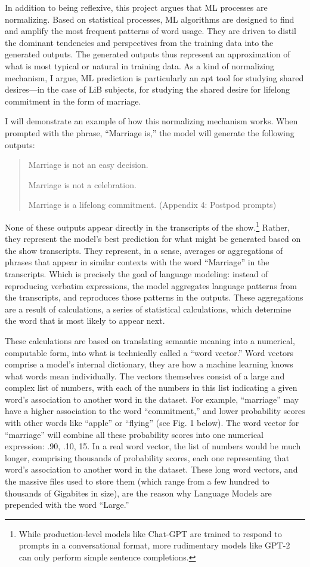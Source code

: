 \documentclass[11pt]{article}
\begin{document}
In addition to being reflexive, this project argues that ML processes
are normalizing. Based on statistical processes, ML algorithms are
designed to find and amplify the most frequent patterns of word usage.
They are driven to distil the dominant tendencies and perspectives
from the training data into the generated outputs. The generated
outputs thus represent an approximation of what is most typical or
natural in training data. As a kind of normalizing mechanism, I argue,
ML prediction is particularly an apt tool for studying shared
desires—in the case of LiB subjects, for studying the shared desire
for lifelong commitment in the form of marriage.

I will demonstrate an example of how this normalizing mechanism works.
When prompted with the phrase, “Marriage is,” the model will generate
the following outputs:

\begin{quote}
Marriage is not an easy decision.

Marriage is not a celebration.

Marriage is a lifelong commitment. (Appendix 4: Postpod prompts)
\end{quote}
None of these outputs appear directly in the transcripts of the
show.\footnote{While production-level models like Chat-GPT are trained to
respond to prompts in a conversational format, more rudimentary models
like GPT-2 can only perform simple sentence completions.} Rather, they represent the model’s best prediction for
what might be generated based on the show transcripts. They represent,
in a sense, averages or aggregations of phrases that appear in similar
contexts with the word “Marriage” in the transcripts. Which is
precisely the goal of language modeling: instead of reproducing
verbatim expressions, the model aggregates language patterns from the
transcripts, and reproduces those patterns in the outputs. These
aggregations are a result of calculations, a series of statistical
calculations, which determine the word that is most likely to appear
next.

These calculations are based on translating semantic meaning into a
numerical, computable form, into what is technically called a “word
vector.” Word vectors comprise a model’s internal dictionary, they are
how a machine learning knows what words mean individually. The vectors
themselves consist of a large and complex list of numbers, with each
of the numbers in this list indicating a given word’s association to
another word in the dataset. For example, “marriage” may have a higher
association to the word “commitment,” and lower probability scores
with other words like “apple” or “flying” (see Fig. 1 below). The word
vector for “marriage” will combine all these probability scores into
one numerical expression: .90, .10, 15. In a real word vector, the
list of numbers would be much longer, comprising thousands of
probability scores, each one representing that word’s association to
another word in the dataset. These long word vectors, and the massive
files used to store them (which range from a few hundred to thousands
of Gigabites in size), are the reason why Language Models are
prepended with the word “Large.”
\end{document}
